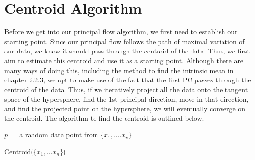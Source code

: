 \documentclass[12pt]{report}
\begin{document}
\section{Centroid Algorithm}
Before we get into our principal flow algorithm, we first need to 
establish our starting point. Since our principal flow 
follows the path of maximal variation of our data, 
we know it should pass through the centroid of the data. 
Thus, we first aim to estimate this centroid and use it as a starting point.
Although there are many ways of doing this,
including the method to find the intrinsic mean in chapter 2.2.3,
we opt to make use of the fact that 
the first PC passes through the centroid of the data. Thus, if we 
iteratively project all the data onto the tangent space of the hypersphere, 
find the 1st principal direction, move in that direction, 
and find the projected point on the hypersphere, we will eventually converge on the 
centroid. The algorithm to find the centroid is outlined below.
\begin{algorithm}
    $p = $ a random data point from $\{x_1,....x_n\}$\;
    \caption{Centroid($\{x_1,...x_n\}$)}
\end{algorithm}
\end{document}
